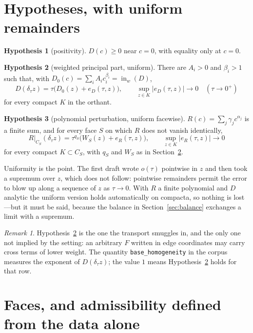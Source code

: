 \documentclass[11pt]{article}
\theoremstyle{definition}
\newtheorem{hypothesis}{Hypothesis}
\theoremstyle{remark}
\newtheorem{remark}{Remark}
\newcommand{\inw}{\operatorname{in}_w}
\begin{document}
\section{Hypotheses, with uniform remainders}

\begin{hypothesis}[positivity]\label{hyp:pos}
$D(c)\ge0$ near $c=0$, with equality only at $c=0$.
\end{hypothesis}

\begin{hypothesis}[weighted principal part, uniform]\label{hyp:base}
There are $A_i>0$ and $\beta_i>1$ such that, with
$D_0(c)=\sum_iA_ic_i^{\beta_i}=\inw(D)$,
\[
  D(\delta_\tau z)=\tau\bigl(D_0(z)+e_D(\tau,z)\bigr),
  \qquad
  \sup_{z\in K}\lvert e_D(\tau,z)\rvert\longrightarrow0
  \quad(\tau\to0^+)
\]
for every compact $K$ in the orthant.
\end{hypothesis}

\begin{hypothesis}[polynomial perturbation, uniform facewise]\label{hyp:pert}
$R(c)=\sum_j\gamma_jc^{\alpha_j}$ is a finite sum, and for every face $S$ on
which $R$ does not vanish identically,
\[
  R|_{C_S}(\delta_\tau z)=\tau^{q_S}\bigl(W_S(z)+e_R(\tau,z)\bigr),
  \qquad
  \sup_{z\in K}\lvert e_R(\tau,z)\rvert\longrightarrow0
\]
for every compact $K\subset C_S$, with $q_S$ and $W_S$ as in
Section~\ref{sec:faces}.
\end{hypothesis}

Uniformity is the point. The first draft wrote $o(\tau)$ pointwise in $z$ and
then took a supremum over $z$, which does not follow: pointwise remainders
permit the error to blow up along a sequence of $z$ as $\tau\to0$. With $R$ a
finite polynomial and $D$ analytic the uniform version holds automatically on
compacta, so nothing is lost---but it must be said, because the balance in
Section~\ref{sec:balance} exchanges a limit with a supremum.

\begin{remark}
Hypothesis~\ref{hyp:base} is the one the transport smuggles in, and the only
one not implied by the setting: an arbitrary $F$ written in edge coordinates
may carry cross terms of lower weight. The quantity
\texttt{base\_homogeneity} in the corpus measures the exponent of
$D(\delta_\tau z)$; the value $1$ means Hypothesis~\ref{hyp:base} holds for
that row.
\end{remark}

\section{Faces, and admissibility defined from the data alone}
\label{sec:faces}
\end{document}
